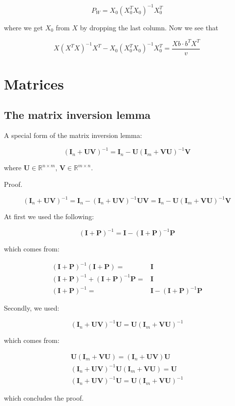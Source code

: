 \documentclass{article}
\begin{document}
\begin{appendices}
\begin{equation}
    P_W = X_0 (X^T_0 X_0)^{-1} X^T_0
\end{equation}

where we get $X_0$ from $X$ by dropping the last column. Now we see that

\begin{equation}
    X (X^TX)^{-1} X^T - X_0 (X^T_0 X_0)^{-1} X^T_0 = \frac{Xb\cdot b^TX^T}{v}
\end{equation}

\section{Matrices}

\subsection{The matrix inversion lemma}\label{app:matrix_inv_lemma}

A special form of the matrix inversion lemma:

\[
(\bm{I}_n + \bm{U}\bm{V})^{-1} = \bm{I}_n - \bm{U}(\bm{I}_m + \bm{V}\bm{U})^{-1}\bm{V}
\]

where $\bm{U} \in \mathbb{R}^{n\times m}$, $\bm{V} \in \mathbb{R}^{m\times n}$.

Proof.

\[
(\bm{I}_n + \bm{U}\bm{V})^{-1} = \bm{I}_n - (\bm{I}_n + \bm{U}\bm{V})^{-1}\bm{U}\bm{V} = \bm{I}_n - \bm{U}(\bm{I}_m + \bm{V}\bm{U})^{-1}\bm{V}
\]

At first we used the following:

\[
(\bm{I} + \bm{P})^{-1} = \bm{I} - (\bm{I} + \bm{P})^{-1} \bm{P}
\]

which comes from:

\[
\begin{split}
(\bm{I} + \bm{P})^{-1}(\bm{I} + \bm{P}) =& \bm{I}\\
(\bm{I} + \bm{P})^{-1} + (\bm{I} + \bm{P})^{-1} \bm{P} =& \bm{I}\\
(\bm{I} + \bm{P})^{-1} =& \bm{I} - (\bm{I} + \bm{P})^{-1} \bm{P}
\end{split}
\]

Secondly, we used:

\[
(\bm{I}_n+\bm{U}\bm{V})^{-1}\bm{U} = \bm{U}(\bm{I}_m+\bm{V}\bm{U})^{-1}
\]

which comes from:

\[
\begin{split}
    \bm{U}(\bm{I}_m + \bm{V}\bm{U}) = (\bm{I}_n + \bm{U}\bm{V})\bm{U}\\
    (\bm{I}_n + \bm{U}\bm{V})^{-1}\bm{U}(\bm{I}_m+\bm{V}\bm{U}) = \bm{U}\\
    (\bm{I}_n+\bm{U}\bm{V})^{-1}\bm{U} = \bm{U}(\bm{I}_m+\bm{V}\bm{U})^{-1}
\end{split}
\]

which concludes the proof.

\end{appendices}
\end{document}

